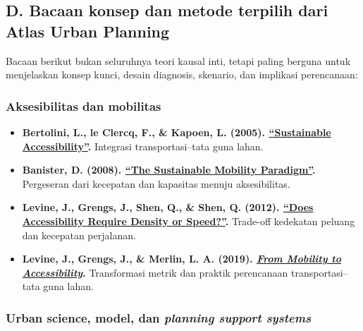 \documentclass[
  indonesian,
  11pt,
  a4paper,
  oneside,
  openany]{report}
\providecommand{\tightlist}{%
  \setlength{\itemsep}{0pt}\setlength{\parskip}{0pt}}
\begin{document}
\subsection{D. Bacaan konsep dan metode terpilih dari Atlas Urban
Planning}\label{d.-bacaan-konsep-dan-metode-terpilih-dari-atlas-urban-planning}

Bacaan berikut bukan seluruhnya teori kausal inti, tetapi paling berguna
untuk menjelaskan konsep kunci, desain diagnosis, skenario, dan
implikasi perencanaan:

\subsubsection{Aksesibilitas dan
mobilitas}\label{aksesibilitas-dan-mobilitas}

\begin{itemize}
\tightlist
\item
  \textbf{Bertolini, L., le Clercq, F., \& Kapoen, L. (2005).
  \href{https://doi.org/10.1016/j.tranpol.2005.01.006}{``Sustainable
  Accessibility''}.} Integrasi transportasi--tata guna lahan.
\item
  \textbf{Banister, D. (2008).
  \href{https://doi.org/10.1016/j.tranpol.2007.10.005}{``The Sustainable
  Mobility Paradigm''}.} Pergeseran dari kecepatan dan kapasitas menuju
  aksesibilitas.
\item
  \textbf{Levine, J., Grengs, J., Shen, Q., \& Shen, Q. (2012).
  \href{https://doi.org/10.1080/01944363.2012.677119}{``Does
  Accessibility Require Density or Speed?''}.} Trade-off kedekatan
  peluang dan kecepatan perjalanan.
\item
  \textbf{Levine, J., Grengs, J., \& Merlin, L. A. (2019).
  \href{https://www.cornellpress.cornell.edu/book/9781501716096/from-mobility-to-accessibility/}{\emph{From
  Mobility to Accessibility}}.} Transformasi metrik dan praktik
  perencanaan transportasi--tata guna lahan.
\end{itemize}

\subsubsection{\texorpdfstring{Urban science, model, dan \emph{planning
support
systems}}{Urban science, model, dan planning support systems}}\label{urban-science-model-dan-planning-support-systems}
\end{document}
